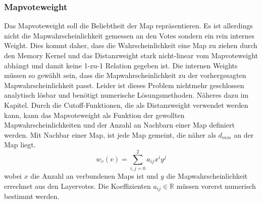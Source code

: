         \subsubsection{Mapvoteweight}
            Das Mapvoteweight soll die Beliebtheit der Map repräsentieren. 
            Es ist allerdings nicht die Mapwahrscheinlichkeit gemessen an den Votes sondern ein rein internes Weight. 
            Dies kommt daher, dass die Wahrscheinlichkeit eine Map zu ziehen durch den Memory Kernel und das Distanzweight stark nicht-linear vom Mapvoteweight abhängt und damit keine 1-zu-1 Relation gegeben ist.
            Die internen Weights müssen so gewählt sein, dass die Mapwahrscheinlichkeit zu der vorhergesagten Mapwahrscheinlichkeit passt. 
            Leider ist dieses Problem nichtmehr geschlossen analytisch lösbar und benötigt numerische Lösungsmethoden. 
            Näheres dazu im  Kapitel.
            Durch die Cutoff-Funktionen, die als Distanzweight verwendet werden kann, 
            kann das Mapvoteweight als Funktion der gewollten Mapwahrscheinlichkeiten und der Anzahl an \glqq{}Nachbarn\grqq{} einer Map definiert werden. 
            Mit Nachbar einer Map, ist jede Map gemeint, die näher als $d_{min}$ an der Map liegt. 
            \begin{equation}
                \label{eq:mapweight}
                w_v(v) = \sum_{i,j = 0}^2 a_{ij}x^i y^j
            \end{equation}
            wobei $x$ die Anzahl an verbundenen Maps ist und $y$ die Mapwahrscheinlichkeit errechnet aus den Layervotes.
            Die Koeffizienten $a_{ij}\in\mathbb{R}$ müssen vorerst numerisch bestimmt werden. 
